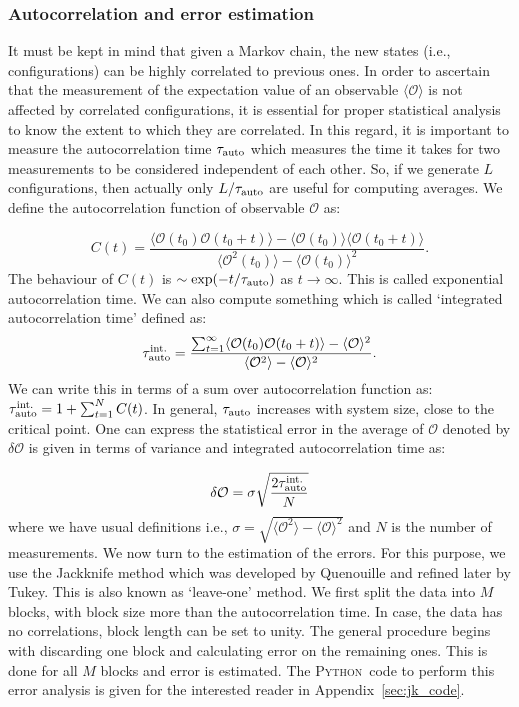 \documentclass[letter,11pt]{article}
\newcommand{\PY}{\textsc{Python}}
\begin{document}
\subsubsection{\label{sec:autocorr}Autocorrelation and error estimation} 
It must be kept in mind that given a Markov chain, the new states 
(i.e., configurations) can be highly correlated to previous ones. 
In order to ascertain that the measurement of the expectation value of an observable $\langle \mathcal{O} \rangle$ is not affected by correlated configurations, it is essential for proper statistical analysis to know the extent to which they are correlated. In this regard, it is important to measure
the autocorrelation time $ \tau_{\rm{auto}}$ which measures the time it takes for two measurements to be considered independent of each other. So, if we generate $L$ configurations, then actually only $L/\tau_{\rm{auto}}$ are useful for computing averages.
We define the autocorrelation function of observable $\mathcal{O}$ as:
 
 \begin{equation}
 	C(t) = \frac{\langle \mathcal{O}(t_0) \mathcal{O}(t_0 + t) \rangle - \langle \mathcal{O}(t_0)\rangle \langle \mathcal{O}(t_0 + t) \rangle}{\langle \mathcal{O}^2(t_0)\rangle - \langle \mathcal{O}(t_0)\rangle^{2}}.
 \end{equation}
The behaviour of $C(t)$ is $\sim \exp(-t/\tau_{\rm{auto}})$ as $ t \to \infty$. This is called exponential autocorrelation time. We can also compute something which is called `integrated autocorrelation time' defined as:
\begin{equation}
	\tau_{\rm{auto}}^{\rm{int.}} = \frac{\sum_{t=1}^{\infty} \langle \mathcal{O}(t_0) \mathcal{O}(t_0 + t) \rangle - \langle \mathcal{O} \rangle^2 }{\langle \mathcal{O}^2\rangle - \langle \mathcal{O}\rangle^{2}}.
\end{equation}
We can write this in terms of a sum over autocorrelation function as: $\tau_{\rm{auto}}^{\rm{int.}} = 1 + \sum_{t=1}^{N} C(t)$. In general, $ \tau_{\rm{auto}}$ increases with system size, close to the critical point. One 
can express the statistical error in the average of $\mathcal{O}$ denoted 
by $\delta \mathcal{O}$ is given in terms of variance and integrated autocorrelation time as:

\begin{equation}
	\delta \mathcal{O} = \sigma \sqrt{\frac{2 \tau_{\rm{auto}}^{\rm{int.}}}{N}}  %
\end{equation}
where we have usual definitions i.e., 
$\sigma = \sqrt{\langle \mathcal{O}^2\rangle - \langle \mathcal{O}\rangle^{2}}$ and $N$ is the number of measurements. We now turn to the estimation of the errors. For this purpose, we use the Jackknife method which was developed by Quenouille and refined later by Tukey. This is also known as `leave-one' method. We first split the data into $M$ blocks, with block size more than the autocorrelation time. In case, the data has no correlations, block length can be set to unity. The general procedure begins with discarding one block and calculating error on the remaining ones. This is done for all $M$ blocks and error is estimated. The \PY~code to perform this error analysis is given for the interested reader in Appendix~\ref{sec:jk_code}. 
\end{document}
